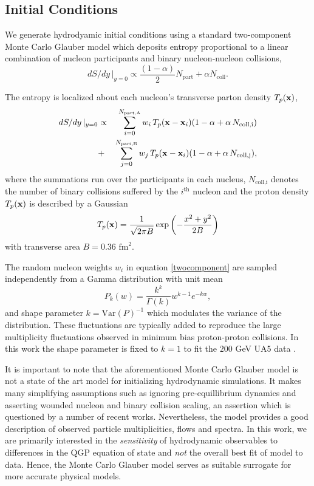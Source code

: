 \documentclass[aps,prc,reprint,amsmath,nofootinbib,superscriptaddress]{revtex4-1}
\begin{document}
\subsection{Initial Conditions}

We generate hydrodyamic initial conditions using a standard two-component Monte Carlo Glauber model which deposits entropy proportional to a linear combination of nucleon participants and binary nucleon-nucleon collisions,
\begin{equation}
 dS/dy \,\vert_{y=0} \propto \frac{(1-\alpha)}{2}N_\text{part} + \alpha N_\text{coll}.
\end{equation}

The entropy is localized about each nucleon's transverse parton density $T_p({\bf x})$,
\begin{eqnarray}
 dS/dy \,\vert_{y=0} &\propto& \sum\limits_{i=0}^{N_\text{part,A}} w_i\, T_p({\bf x} - {\bf x}_i)(1-\alpha + \alpha\, N_\text{coll,i}) \nonumber \\
                     &+& \sum\limits_{j=0}^{N_\text{part,B}} w_j\, T_p({\bf x} - {\bf x}_i)(1-\alpha + \alpha\, N_\text{coll,j}),
 \label{twocomponent}
\end{eqnarray}
where the summations run over the participants in each nucleus, $N_\text{coll,i}$ denotes the number of binary collisions suffered by the $i^\text{th}$ nucleon and the proton density $T_p({\bf x})$ is 
described by a Gaussian
\begin{equation}
 T_p({\bf x}) = \frac{1}{\sqrt{2 \pi B}} \exp \left(-\frac{x^2+y^2}{2 B} \right)
\end{equation}
with transverse area $B = 0.36$ $\text{fm}^2$.

The random nucleon weights $w_i$ in equation \eqref{twocomponent} are sampled independently from a Gamma distribution with unit mean
\begin{equation}
 P_k(w) = \frac{k^k}{\Gamma(k)} w^{k-1} e^{-k w},
\end{equation}
and shape parameter $k = \text{Var}(P)^{-1}$ which modulates the variance of the distribution. These fluctuations are typically added \cite{?} to reproduce the large multiplicity fluctuations observed in minimum bias proton-proton 
collisions. In this work the shape parameter is fixed to $k=1$ to fit the $200$ GeV UA5 data \cite{?}. 

It is important to note that the aforementioned Monte Carlo Glauber model is not a state of the art model for initializing hydrodynamic simulations. It makes many simplifying assumptions such as ignoring pre-equillibrium dynamics
and asserting wounded nucleon and binary collision scaling, an assertion which is questioned by a number of recent works. Nevertheless, the model provides a good description of observed particle multiplicities, flows and spectra. In this work, we 
are primarily interested in the \emph{sensitivity} of hydrodynamic observables to differences in the QGP equation of state and \emph{not} the overall best fit of model to data. Hence, the Monte Carlo Glauber model serves as suitable 
surrogate for more accurate physical models.
\end{document}
